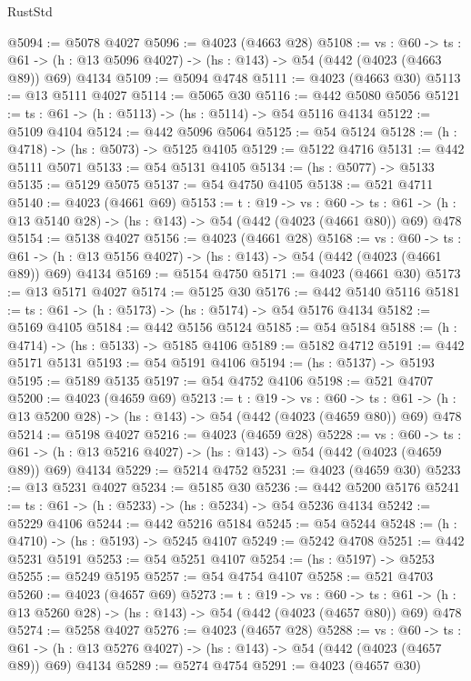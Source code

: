 \begin{lexlean}{RustStd}
\begin{coremodule}
@5094 := @5078 @4027
@5096 := @4023 (@4663 @28)
@5108 := {vs : @60} ->
  {ts : @61} -> (h : @13 @5096 @4027) -> (hs : @143) -> @54 (@442 (@4023 (@4663 @89)) @69) @4134
@5109 := @5094 @4748
@5111 := @4023 (@4663 @30)
@5113 := @13 @5111 @4027
@5114 := @5065 @30
@5116 := @442 @5080 @5056
@5121 := {ts : @61} -> (h : @5113) -> (hs : @5114) -> @54 @5116 @4134
@5122 := @5109 @4104
@5124 := @442 @5096 @5064
@5125 := @54 @5124
@5128 := (h : @4718) -> (hs : @5073) -> @5125 @4105
@5129 := @5122 @4716
@5131 := @442 @5111 @5071
@5133 := @54 @5131 @4105
@5134 := (hs : @5077) -> @5133
@5135 := @5129 @5075
@5137 := @54 @4750 @4105
@5138 := @521 @4711
@5140 := @4023 (@4661 @69)
@5153 := {t : @19} ->
  {vs : @60} ->
  {ts : @61} -> (h : @13 @5140 @28) -> (hs : @143) -> @54 (@442 (@4023 (@4661 @80)) @69) @478
@5154 := @5138 @4027
@5156 := @4023 (@4661 @28)
@5168 := {vs : @60} ->
  {ts : @61} -> (h : @13 @5156 @4027) -> (hs : @143) -> @54 (@442 (@4023 (@4661 @89)) @69) @4134
@5169 := @5154 @4750
@5171 := @4023 (@4661 @30)
@5173 := @13 @5171 @4027
@5174 := @5125 @30
@5176 := @442 @5140 @5116
@5181 := {ts : @61} -> (h : @5173) -> (hs : @5174) -> @54 @5176 @4134
@5182 := @5169 @4105
@5184 := @442 @5156 @5124
@5185 := @54 @5184
@5188 := (h : @4714) -> (hs : @5133) -> @5185 @4106
@5189 := @5182 @4712
@5191 := @442 @5171 @5131
@5193 := @54 @5191 @4106
@5194 := (hs : @5137) -> @5193
@5195 := @5189 @5135
@5197 := @54 @4752 @4106
@5198 := @521 @4707
@5200 := @4023 (@4659 @69)
@5213 := {t : @19} ->
  {vs : @60} ->
  {ts : @61} -> (h : @13 @5200 @28) -> (hs : @143) -> @54 (@442 (@4023 (@4659 @80)) @69) @478
@5214 := @5198 @4027
@5216 := @4023 (@4659 @28)
@5228 := {vs : @60} ->
  {ts : @61} -> (h : @13 @5216 @4027) -> (hs : @143) -> @54 (@442 (@4023 (@4659 @89)) @69) @4134
@5229 := @5214 @4752
@5231 := @4023 (@4659 @30)
@5233 := @13 @5231 @4027
@5234 := @5185 @30
@5236 := @442 @5200 @5176
@5241 := {ts : @61} -> (h : @5233) -> (hs : @5234) -> @54 @5236 @4134
@5242 := @5229 @4106
@5244 := @442 @5216 @5184
@5245 := @54 @5244
@5248 := (h : @4710) -> (hs : @5193) -> @5245 @4107
@5249 := @5242 @4708
@5251 := @442 @5231 @5191
@5253 := @54 @5251 @4107
@5254 := (hs : @5197) -> @5253
@5255 := @5249 @5195
@5257 := @54 @4754 @4107
@5258 := @521 @4703
@5260 := @4023 (@4657 @69)
@5273 := {t : @19} ->
  {vs : @60} ->
  {ts : @61} -> (h : @13 @5260 @28) -> (hs : @143) -> @54 (@442 (@4023 (@4657 @80)) @69) @478
@5274 := @5258 @4027
@5276 := @4023 (@4657 @28)
@5288 := {vs : @60} ->
  {ts : @61} -> (h : @13 @5276 @4027) -> (hs : @143) -> @54 (@442 (@4023 (@4657 @89)) @69) @4134
@5289 := @5274 @4754
@5291 := @4023 (@4657 @30)

\end{coremodule}
\end{lexlean}
